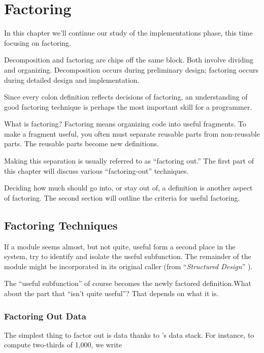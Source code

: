 
\chapter{Factoring}

In this chapter we'll continue our study of the implementations phase,
this time focusing on factoring.

Decomposition and factoring are chips off the same block. Both involve
dividing and organizing. Decomposition occurs during preliminary
design; factoring occurs during detailed design and implementation.

Since every colon definition reflects decisions of factoring, an
understanding of good factoring technique is perhaps the most
important skill for a \Forth{} programmer.

What is factoring? Factoring means organizing code into useful
fragments. To make a fragment useful, you often must separate reusable
parts from non-reusable parts. The reusable parts become new
definitions.

Making this separation is usually referred to as ``factoring out.''
The first part of this chapter will discuss various ``factoring-out''
techniques.

Deciding how much should go into, or stay out of, a definition is
another aspect of factoring. The second section will outline the
criteria for useful factoring.

\section{Factoring Techniques}

\begin{tfquot}
If a module seems almost, but not quite, useful form a second place in
the system, try to identify and isolate the useful subfunction. The
remainder of the module might be incorporated in its original caller
(from ``\emph{Structured Design}'' \cite{stevens74-6}).
\end{tfquot}
The ``useful subfunction'' of course becomes the newly factored
definition.What about the part that ``isn't quite useful''? That
depends on what it is.

\subsection{Factoring Out Data}
The simplest thing to factor out is data thanks to \Forth{}'s data
stack. For instance, to compute two-thirds of 1,000, we write

